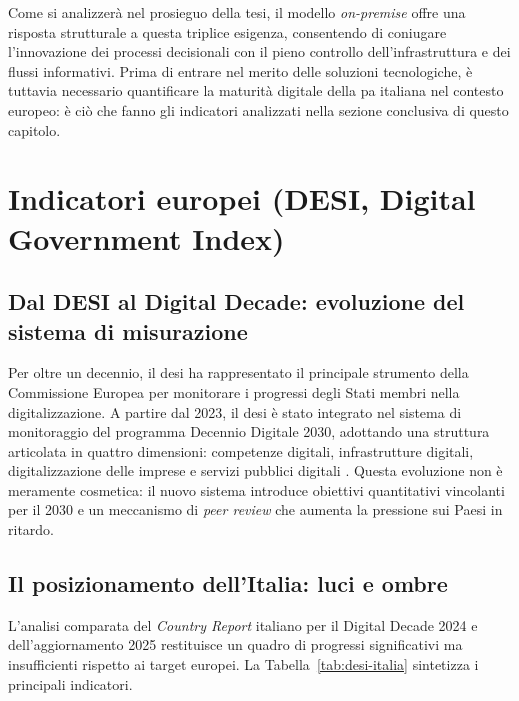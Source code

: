 Come si analizzerà nel prosieguo della tesi, il modello \textit{on-premise} offre una risposta strutturale a questa triplice esigenza, consentendo di coniugare l'innovazione dei processi decisionali con il pieno controllo dell'infrastruttura e dei flussi informativi. Prima di entrare nel merito delle soluzioni tecnologiche, è tuttavia necessario quantificare la maturità digitale della \gls{pa} italiana nel contesto europeo: è ciò che fanno gli indicatori analizzati nella sezione conclusiva di questo capitolo.


\section{Indicatori europei (DESI, Digital Government Index)}
\label{sec:indicatori-europei}

\subsection{Dal DESI al Digital Decade: evoluzione del sistema di misurazione}

Per oltre un decennio, il \gls{desi} ha rappresentato il principale strumento della Commissione Europea per monitorare i progressi degli Stati membri nella digitalizzazione. A partire dal 2023, il \gls{desi} è stato integrato nel sistema di monitoraggio del programma Decennio Digitale 2030, adottando una struttura articolata in quattro dimensioni: competenze digitali, infrastrutture digitali, digitalizzazione delle imprese e servizi pubblici digitali \parencite{DecisioneDecennioDigitale,DESI2024}. Questa evoluzione non è meramente cosmetica: il nuovo sistema introduce obiettivi quantitativi vincolanti per il 2030 e un meccanismo di \textit{peer review} che aumenta la pressione sui Paesi in ritardo.

\subsection{Il posizionamento dell'Italia: luci e ombre}

L'analisi comparata del \textit{Country Report} italiano per il Digital Decade 2024 e dell'aggiornamento 2025 \parencite{ItalyDigitalDecade2024,ItalyDigitalDecade2025} restituisce un quadro di progressi significativi ma insufficienti rispetto ai target europei. La Tabella~\ref{tab:desi-italia} sintetizza i principali indicatori.

